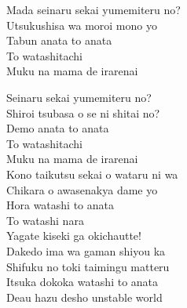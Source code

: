 \begin{multicols}{2}
Mada seinaru sekai yumemiteru no?\\
Utsukushisa wa moroi mono yo\\
Tabun anata to anata\\
To watashitachi\\
Muku na mama de irarenai\\



Seinaru sekai yumemiteru no?\\
Shiroi tsubasa o se ni shitai no?\\
Demo anata to anata\\
To watashitachi\\
Muku na mama de irarenai\\

Kono taikutsu sekai o wataru ni wa\\
Chikara o awasenakya dame yo\\
Hora watashi to anata\\
To watashi nara\\
Yagate kiseki ga okichautte!\\
Dakedo ima wa gaman shiyou ka\\
Shifuku no toki taimingu matteru\\
Itsuka dokoka watashi to anata\\
Deau hazu desho unstable world\\

\end{multicols}

\ifdefined\COMPLETE
\else
	
\fi
